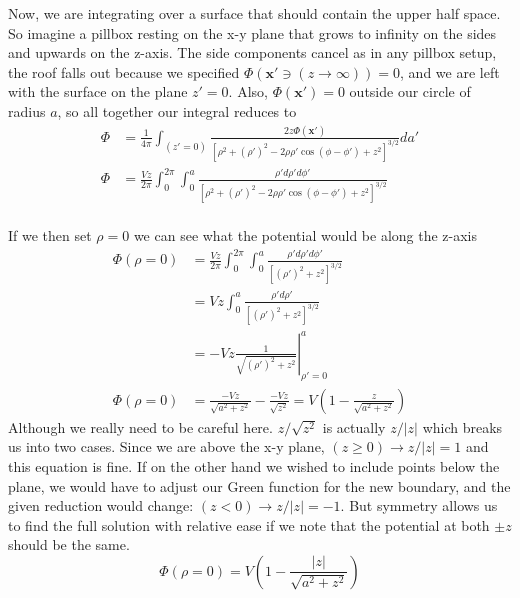 \documentclass{article}
\begin{document}
Now, we are integrating over a surface that should contain the upper half space. So imagine a pillbox resting on the x-y plane that grows to infinity on the sides and upwards on the z-axis. The side components cancel as in any pillbox setup, the roof falls out because we specified $\Phi(\mathbf{x'}\ni(z\to\infty))=0$, and we are left with the surface on the plane $z'=0$. Also, $\Phi(\mathbf{x'})=0$ outside our circle of radius $a$, so all together our integral reduces to
\begin{align*}
\Phi &= \frac{1}{4\pi} \int_{(z'=0)} \frac{2z\Phi(\mathbf{x'})}{[\rho^{2} + (\rho')^{2} - 2\rho\rho'\cos(\phi-\phi') + z^{2}]^{3/2}} da'\\
\Phi &= \boxed{\frac{Vz}{2\pi} \int_{0}^{2\pi}\int_{0}^{a} \frac{\rho' d\rho'd\phi'}{[\rho^{2} + (\rho')^{2} - 2\rho\rho'\cos(\phi-\phi') + z^{2}]^{3/2}}}\\
\end{align*}

If we then set $\rho=0$ we can see what the potential would be along the z-axis
\begin{align*}
\Phi(\rho=0) &= \frac{Vz}{2\pi} \int_{0}^{2\pi}\int_{0}^{a} \frac{\rho' d\rho'd\phi'}{[(\rho')^{2} + z^{2}]^{3/2}}\\
&= Vz \int_{0}^{a} \frac{\rho' d\rho'}{[(\rho')^{2} + z^{2}]^{3/2}}\\
&= -Vz \left.\frac{1}{\sqrt{(\rho')^{2} + z^{2}}}\right|_{\rho'=0}^{a}\\
\Phi(\rho=0) &= \frac{-Vz}{\sqrt{a^{2} + z^{2}}} - \frac{-Vz}{\sqrt{z^{2}}} = \boxed{V\left( 1 - \frac{z}{\sqrt{a^{2}+z^{2}}} \right)}
\end{align*}
Although we really need to be careful here. $z/\sqrt{z^{2}}$ is actually $z/|z|$ which breaks us into two cases. Since we are above the x-y plane, $(z\ge 0)\to z/|z|=1$ and this equation is fine. If on the other hand we wished to include points below the plane, we would have to adjust our Green function for the new boundary, and the given reduction would change: $(z<0)\to z/|z|=-1$. But symmetry allows us to find the full solution with relative ease if we note that the potential at both $\pm z$ should be the same.
\[ \Phi(\rho=0) = \boxed{V\left( 1 - \frac{|z|}{\sqrt{a^{2}+z^{2}}} \right)} \]
\end{document}
